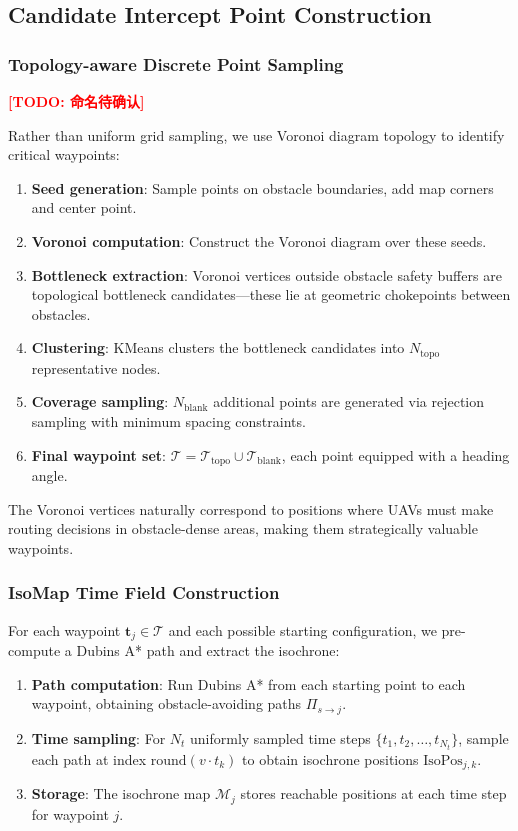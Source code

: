 \documentclass[10pt,conference]{IEEEtran}
\newcommand{\marktodo}[1]{\textcolor{red}{\textbf{[TODO: #1]}}}
\begin{document}
\subsection{Candidate Intercept Point Construction}

\subsubsection{Topology-aware Discrete Point Sampling}

\marktodo{命名待确认}

Rather than uniform grid sampling, we use Voronoi diagram topology to identify critical waypoints:
\begin{enumerate}
    \item \textbf{Seed generation}: Sample points on obstacle boundaries, add map corners and center point.
    \item \textbf{Voronoi computation}: Construct the Voronoi diagram over these seeds.
    \item \textbf{Bottleneck extraction}: Voronoi vertices outside obstacle safety buffers are topological bottleneck candidates---these lie at geometric chokepoints between obstacles.
    \item \textbf{Clustering}: KMeans clusters the bottleneck candidates into $N_{\text{topo}}$ representative nodes.
    \item \textbf{Coverage sampling}: $N_{\text{blank}}$ additional points are generated via rejection sampling with minimum spacing constraints.
    \item \textbf{Final waypoint set}: $\mathcal{T} = \mathcal{T}_{\text{topo}} \cup \mathcal{T}_{\text{blank}}$, each point equipped with a heading angle.
\end{enumerate}

The Voronoi vertices naturally correspond to positions where UAVs must make routing decisions in obstacle-dense areas, making them strategically valuable waypoints.

\subsubsection{IsoMap Time Field Construction}

For each waypoint $\mathbf{t}_j \in \mathcal{T}$ and each possible starting configuration, we pre-compute a Dubins A* path and extract the isochrone:

\begin{enumerate}
    \item \textbf{Path computation}: Run Dubins A* from each starting point to each waypoint, obtaining obstacle-avoiding paths $\Pi_{s \to j}$.
    \item \textbf{Time sampling}: For $N_t$ uniformly sampled time steps $\{t_1, t_2, \ldots, t_{N_t}\}$, sample each path at index $\text{round}(v \cdot t_k)$ to obtain isochrone positions $\text{IsoPos}_{j,k}$.
    \item \textbf{Storage}: The isochrone map $\mathcal{M}_j$ stores reachable positions at each time step for waypoint $j$.
\end{enumerate}
\end{document}
